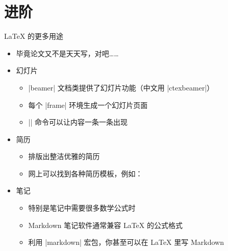 \section{进阶}

\begin{frame}[fragile]{\LaTeX{} 的更多用途}
  \begin{itemize}
    \item 毕竟论文又不是天天写，对吧……
          \pause
    \item 幻灯片
          \begin{itemize}
            \item |beamer| 文档类提供了幻灯片功能（中文用 |ctexbeamer|）
            \item 每个 |frame| 环境生成一个幻灯片页面
            \item |\pause| 命令可以让内容一条一条出现
          \end{itemize}
          \pause
    \item 简历
          \begin{itemize}
            \item 排版出整洁优雅的简历
            \item 网上可以找到各种简历模板，例如：
          \end{itemize}
          \pause
    \item 笔记
          \begin{itemize}
            \item 特别是笔记中需要很多数学公式时
            \item Markdown 笔记软件通常兼容 \LaTeX{} 的公式格式
            \item 利用 |markdown| 宏包，你甚至可以在 \LaTeX{} 里写 Markdown
          \end{itemize}
  \end{itemize}
\end{frame}

